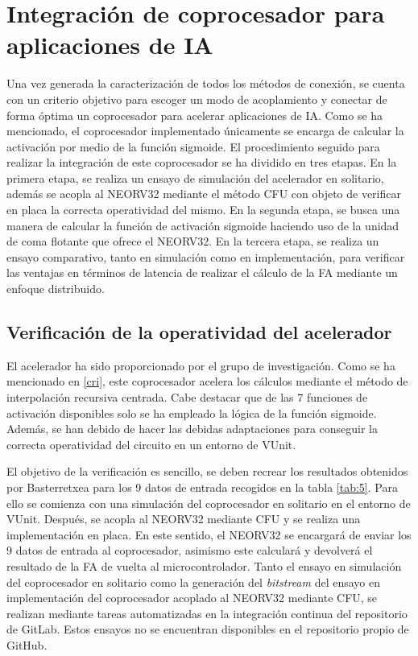 \section{Integración de coprocesador para aplicaciones de IA}

\label{Integ}

Una vez generada la caracterización de todos los métodos de conexión, se cuenta con un criterio objetivo para escoger un modo de acoplamiento y conectar de forma óptima un coprocesador para acelerar aplicaciones de IA.
Como se ha mencionado, el coprocesador implementado únicamente se encarga de calcular la activación por medio de la función sigmoide.
El procedimiento seguido para realizar la integración de este coprocesador se ha dividido en tres etapas. 
En la primera etapa, se realiza un ensayo de simulación del acelerador en solitario, además se acopla al NEORV32 mediante el método CFU con objeto de verificar en placa la correcta operatividad del mismo.
En la segunda etapa, se busca una manera de calcular la función de activación sigmoide haciendo uso de la unidad de coma flotante que ofrece el NEORV32.
En la tercera etapa, se realiza un ensayo comparativo, tanto en simulación como en implementación, para verificar las ventajas en términos de latencia de realizar el cálculo de la FA mediante un enfoque distribuido.

\subsection{Verificación de la operatividad del acelerador}

El acelerador ha sido proporcionado por el grupo de investigación.
Como se ha mencionado en \ref{cri}, este coprocesador acelera los cálculos mediante el método de interpolación recursiva centrada.
Cabe destacar que de las 7 funciones de activación disponibles solo se ha empleado la lógica de la función sigmoide.
Además, se han debido de hacer las debidas adaptaciones para conseguir la correcta operatividad del circuito en un entorno de VUnit.

El objetivo de la verificación es sencillo, se deben recrear los resultados obtenidos por Basterretxea para los 9 datos de entrada recogidos en la tabla \ref{tab:5}.
Para ello se comienza con una simulación del coprocesador en solitario en el entorno de VUnit.
Después, se acopla al NEORV32 mediante CFU y se realiza una implementación en placa.
En este sentido, el NEORV32 se encargará de enviar los 9 datos de entrada al coprocesador, asimismo este calculará y devolverá el resultado de la FA de vuelta al microcontrolador.
Tanto el ensayo en simulación del coprocesador en solitario como la generación del \textit{bitstream} del ensayo en implementación del coprocesador acoplado al NEORV32 mediante CFU, se realizan mediante tareas automatizadas en la integración continua del repositorio de GitLab.
Estos ensayos no se encuentran disponibles en el repositorio propio de GitHub.

